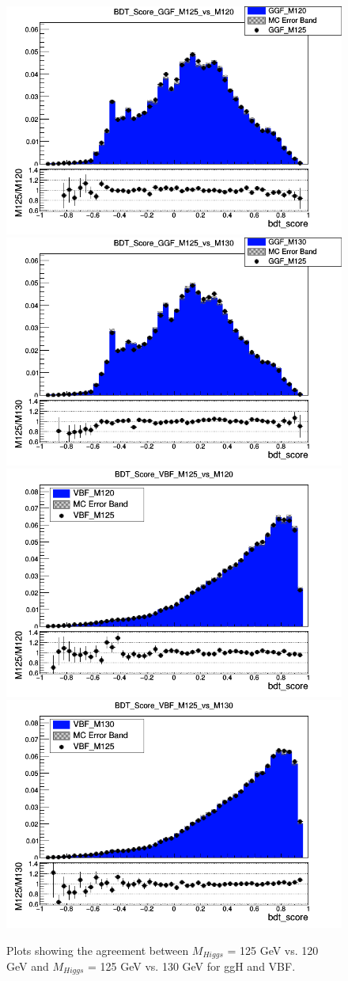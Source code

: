 \begin{figure}[hbp]
  \centering
  \includegraphics[width=0.49\linewidth]{figures/bdt_cats/BDT_Score_GGF_M125_vs_M120.png}
  \includegraphics[width=0.49\linewidth]{figures/bdt_cats/BDT_Score_GGF_M125_vs_M130.png}
  \includegraphics[width=0.49\linewidth]{figures/bdt_cats/BDT_Score_VBF_M125_vs_M120.png}
  \includegraphics[width=0.49\linewidth]{figures/bdt_cats/BDT_Score_VBF_M125_vs_M130.png}
  \caption
   {Plots showing the agreement between $M_{Higgs}$ = 125 GeV vs. 120 GeV and $M_{Higgs}$ = 125 GeV vs. 130 GeV for ggH and VBF.}
  \label{fig:mass_independence}
\end{figure}
